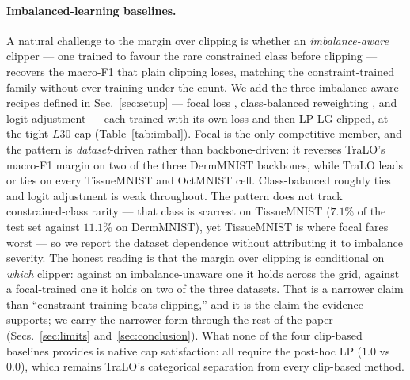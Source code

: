 \documentclass[10pt]{article}
\begin{document}
{\color{blue}
\paragraph{Imbalanced-learning baselines.}
A natural challenge to the margin over clipping is whether an \emph{imbalance-aware}
clipper --- one trained to favour the rare constrained class before clipping ---
recovers the macro-F1 that plain clipping loses, matching the constraint-trained
family without ever training under the count. We add the three imbalance-aware recipes
defined in Sec.~\ref{sec:setup} --- focal loss \citep{lin2017focal}, class-balanced
reweighting \citep{cui2019class}, and logit adjustment \citep{menon2020long} --- each
trained with its own loss and then LP-LG clipped, at the tight $L30$ cap
(Table~\ref{tab:imbal}). Focal is the only competitive member, and the pattern is
\emph{dataset}-driven rather than backbone-driven: it reverses TraLO's macro-F1 margin on
two of the three DermMNIST backbones, while TraLO leads or ties on every TissueMNIST and
OctMNIST cell. Class-balanced roughly ties and logit adjustment is weak throughout. The
pattern does not track constrained-class rarity --- that class is scarcest on TissueMNIST
($7.1\%$ of the test set against $11.1\%$ on DermMNIST), yet TissueMNIST is where focal
fares worst --- so we report the dataset dependence without attributing it to imbalance
severity. The honest reading is that the margin over clipping is conditional on
\emph{which} clipper: against an imbalance-unaware one it holds across the grid, against a
focal-trained one it holds on two of the three datasets. That is a narrower claim than
``constraint training beats clipping,'' and it is the claim the evidence supports; we carry
the narrower form through the rest of the paper (Secs.~\ref{sec:limits}
and~\ref{sec:conclusion}).
What none of the four clip-based baselines provides is
native cap satisfaction: all require the post-hoc LP ($1.0$ vs $0.0$), which remains
TraLO's categorical separation from every clip-based method.}
\end{document}
